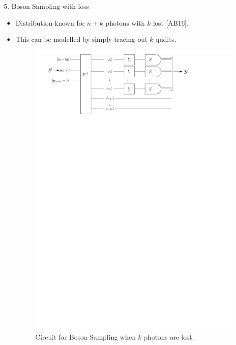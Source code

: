 \documentclass[]{templates/poster}
\begin{document}
\begin{frame}{}
\begin{columns}[t]
\begin{column}{0.422\linewidth}
  \begin{block}{\Large 5. Boson Sampling with loss}
  \begin{itemize}
  \item Distribution known for $n+k$ photons with $k$ lost [AB16].
  \item This can be modelled by simply tracing out $k$ qudits.
  \begin{center}
  \begin{figure}
  \includegraphics[width=0.75\linewidth]{lost_circuit}
  \caption{\label{fig:lost-circuit} Circuit for Boson Sampling when $k$ photons are lost.}
  \end{figure}
  \end{center}
  \end{itemize}
  
  \end{block}
  

\end{column}
\end{columns}
\end{frame}
\end{document}
